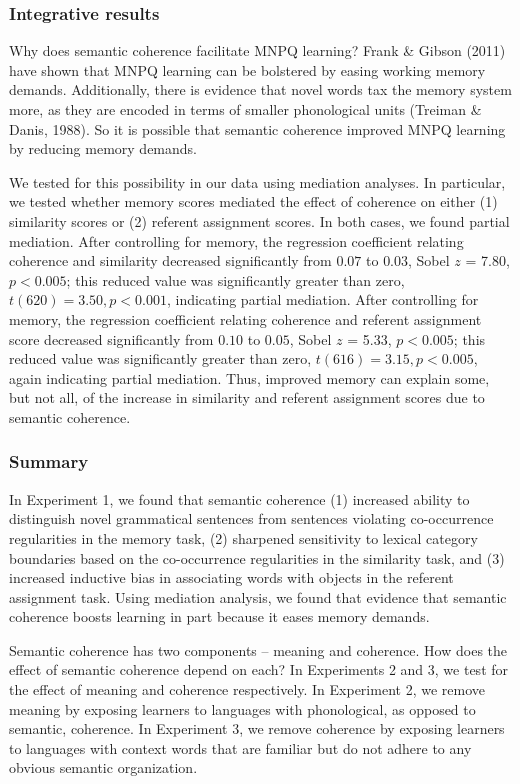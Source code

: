 \documentclass[man,floatsintext]{apa6}
\begin{document}
\subsubsection{Integrative results} Why does semantic coherence facilitate MNPQ learning? Frank \& Gibson (2011) have shown that MNPQ learning can be bolstered by easing working memory demands. Additionally, there is evidence that novel words tax the memory system more, as they are encoded in terms of smaller phonological units (Treiman \& Danis, 1988). So it is possible that semantic coherence improved MNPQ learning by reducing memory demands.

We tested for this possibility in our data using mediation analyses. In particular, we tested whether memory scores mediated the effect of coherence on either (1) similarity scores or (2) referent assignment scores. In both cases, we found partial mediation. After controlling for memory, the regression coefficient relating coherence and similarity decreased significantly from $0.07$ to $0.03$, Sobel $z$ = 7.80, $p < 0.005$; this reduced value was significantly greater than zero, $t(620) = 3.50, p < 0.001$, indicating partial mediation. After controlling for memory, the regression coefficient relating coherence and referent assignment score decreased significantly from $0.10$ to $0.05$, Sobel $z$ = 5.33, $p < 0.005$; this reduced value was significantly greater than zero, $t(616) = 3.15, p < 0.005$, again indicating partial mediation. Thus, improved memory can explain some, but not all, of the increase in similarity and referent assignment scores due to semantic coherence.

\subsubsection{Summary}

In Experiment 1, we found that semantic coherence (1) increased ability to distinguish novel grammatical sentences from sentences violating co-occurrence regularities in the memory task, (2) sharpened sensitivity to lexical category boundaries based on the co-occurrence regularities in the similarity task, and (3) increased inductive bias in associating words with objects in the referent assignment task. Using mediation analysis, we found that evidence that semantic coherence boosts learning in part because it eases memory demands.

Semantic coherence has two components -- meaning and coherence. How does the effect of semantic coherence depend on each? In Experiments 2 and 3, we test for the effect of meaning and coherence respectively. In Experiment 2, we remove meaning by exposing learners to languages with phonological, as opposed to semantic, coherence. In Experiment 3, we remove coherence by exposing learners to languages with context words that are familiar but do not adhere to any obvious semantic organization.
\end{document}
